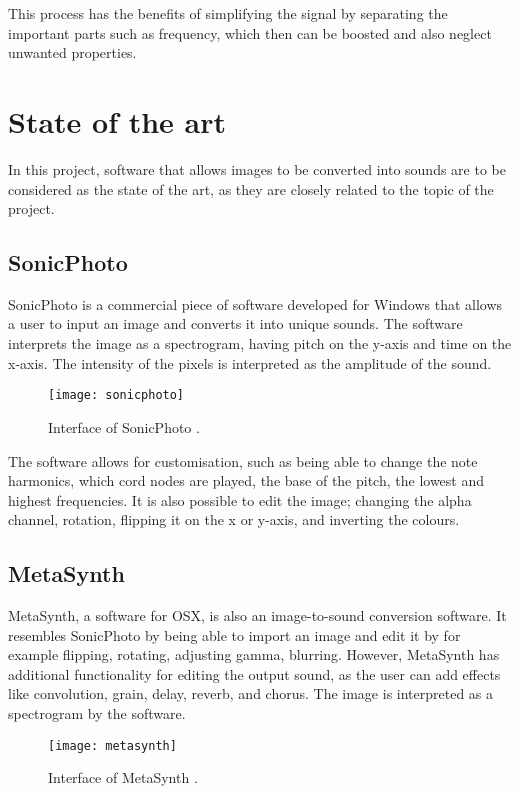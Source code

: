 This process has the benefits of simplifying the signal by separating the important parts such as frequency, which then can be boosted and also neglect unwanted properties.       

\section{State of the art}\label{sec:stateart}
In this project, software that allows images to be converted into sounds are to be considered as the state of the art, as they are closely related to the topic of the project.

\subsection{SonicPhoto}\label{sub:sonic}
SonicPhoto \cite{White2013} is a commercial piece of software developed for Windows that allows a user to input an image and converts it into unique sounds. The software interprets the image as a spectrogram, having pitch on the y-axis and time on the x-axis. The intensity of the pixels is interpreted as the amplitude of the sound. 

\begin{figure}[!h] 
\centering
\texttt{[image: sonicphoto]}
\caption{\label{fig:sonicphoto} Interface of SonicPhoto \cite{White2013}.}
\end{figure}

The software allows for customisation, such as being able to change the note harmonics, which cord nodes are played, the base of the pitch, the lowest and highest frequencies. It is also possible to edit the image; changing the alpha channel, rotation, flipping it on the x or y-axis, and inverting the colours. 

\subsection{MetaSynth}\label{sub:metasynth}
MetaSynth, a software for OSX, is also an image-to-sound conversion software. It resembles SonicPhoto by being able to import an image and edit it by for example flipping, rotating, adjusting gamma, blurring. However, MetaSynth has additional functionality for editing the output sound, as the user can add effects like  convolution, grain, delay, reverb, and chorus. The image is interpreted as a spectrogram by the software.

\begin{figure}[!h] 
\centering
\texttt{[image: metasynth]}
\caption{\label{fig:metasynth} Interface of MetaSynth \cite{UISoftware2014}.}
\end{figure}

